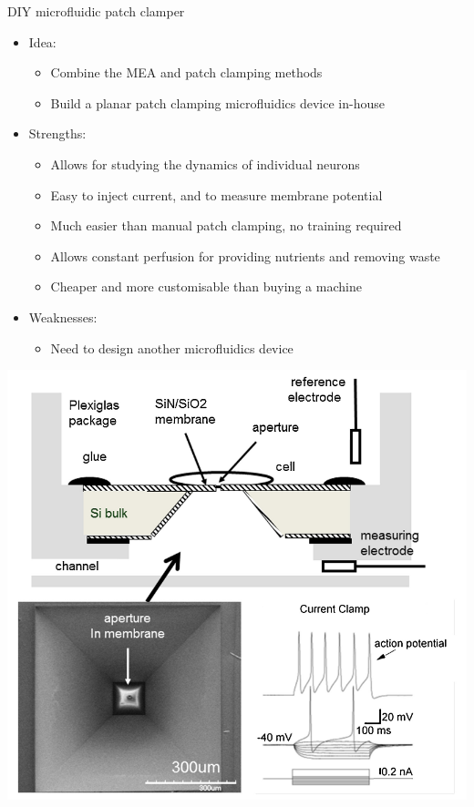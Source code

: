 \documentclass[aspectratio=169]{beamer}
\begin{document}
\begin{frame}[label={sec:org30fb1c7}]{DIY microfluidic patch clamper}
\begin{itemize}
\item Idea:
\begin{itemize}
\item Combine the MEA and patch clamping methods
\item Build a planar patch clamping microfluidics device in-house
\end{itemize}
\item Strengths:
\begin{itemize}
\item Allows for studying the dynamics of individual neurons
\item Easy to inject current, and to measure membrane potential
\item Much easier than manual patch clamping, no training required
\item Allows constant perfusion for providing nutrients and removing waste
\item Cheaper and more customisable than buying a machine
\end{itemize}
\item Weaknesses:
\begin{itemize}
\item Need to design another microfluidics device
\end{itemize}
\end{itemize}

\end{frame}
\begin{frame}[plain]

\begin{center}
\includegraphics[height=1.4\textheight]{./planarpatch1.png}
\end{center}
\end{frame}
\end{document}
